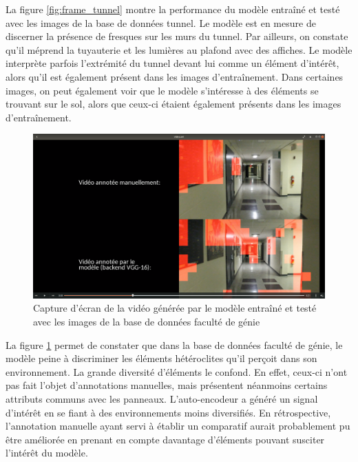     La figure \ref{fig:frame_tunnel} montre la performance du modèle entraîné et testé avec les images de la base de données tunnel. Le modèle est en mesure de discerner la présence de fresques sur les murs du tunnel. Par ailleurs, on constate qu'il méprend la tuyauterie et les lumières au plafond avec des affiches. Le modèle interprète parfois l'extrémité du tunnel devant lui comme un élément d'intérêt, alors qu'il est également présent dans les images d'entraînement. Dans certaines images, on peut également voir que le modèle s’intéresse à des éléments se trouvant sur le sol, alors que ceux-ci étaient également présents dans les images d'entraînement.
    \bigskip

    \begin{figure}
        \centering
        \includegraphics[width=17cm]{images/frame_corridor.png}
        \caption{Capture d'écran de la vidéo générée par le modèle entraîné et testé avec les images de la base de données faculté de génie}
        \label{fig:frame_corridor}
    \end{figure}

    La figure \ref{fig:frame_corridor} permet de constater que dans la base de données faculté de génie, le modèle peine à discriminer les éléments hétéroclites qu'il perçoit dans son environnement. La grande diversité d'éléments le confond. En effet, ceux-ci n'ont pas fait l'objet d'annotations manuelles, mais présentent néanmoins certains attributs communs avec les panneaux. L'auto-encodeur a généré un signal d’intérêt en se fiant à des environnements moins diversifiés. En rétrospective, l'annotation manuelle ayant servi à établir un comparatif aurait probablement pu être améliorée en prenant en compte davantage d'éléments pouvant susciter l’intérêt du modèle.
    \bigskip

